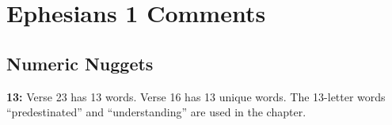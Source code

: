 \section{Ephesians 1 Comments}

\subsection{Numeric Nuggets}
\textbf{13:} Verse 23 has 13 words. Verse 16 has 13 unique words. The 13-letter words ``predestinated'' and  ``understanding'' are used in the chapter.

